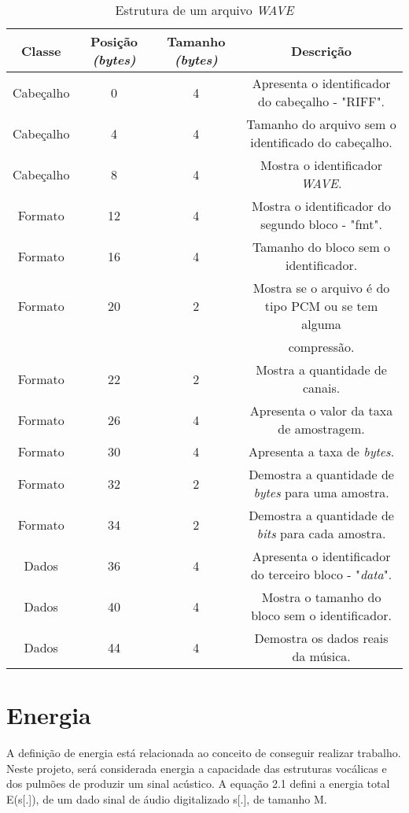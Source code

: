 \documentclass[a4paper,12pt,twoside,openright]{report}
\begin{document}
\vspace*{+10pt}

\begin{table}[h] 

	\caption{Estrutura de um arquivo \textit{WAVE}}
	\begin{tabular}{c|c|c|c}
		\textbf{Classe} & \textbf{Posi\c{c}\~{a}o \textit{(bytes)}} & \textbf{Tamanho \textit{(bytes)}} & \textbf{Descri\c{c}\~{a}o}\\
		\hline
		Cabe\c{c}alho & 0 & 4 & Apresenta o identificador do cabe\c{c}alho - "RIFF".\\
		Cabe\c{c}alho & 4 & 4 & Tamanho do arquivo sem o identificado do cabe\c{c}alho.\\
		Cabe\c{c}alho & 8 & 4 & Mostra o identificador \textit{WAVE}.\\
		\hline
		Formato & 12 & 4 & Mostra o identificador do segundo bloco - "fmt".\\
		Formato & 16 & 4 & Tamanho do bloco sem o identificador.\\
		Formato & 20 & 2 & Mostra se o arquivo \'{e} do tipo PCM ou se tem alguma \\ & & & compress\~{a}o.\\
		Formato & 22 & 2 & Mostra a quantidade de canais.\\
		Formato & 26 & 4 & Apresenta o valor da taxa de amostragem.\\
		Formato & 30 & 4 & Apresenta a taxa de \textit{bytes}.\\
		Formato & 32 & 2 & Demostra a quantidade de \textit{bytes} para uma amostra.\\
		Formato & 34 & 2 & Demostra a quantidade de \textit{bits} para cada amostra.\\
		\hline
		Dados & 36 & 4 & Apresenta o identificador do terceiro bloco - "\textit{data}".\\
		Dados & 40 & 4 & Mostra o tamanho do bloco sem o identificador.\\
		Dados & 44 & 4 & Demostra os dados reais da m\'{u}sica.
		
	\end{tabular}
\end{table}     



\section{Energia}
\label{energia}
\par A defini{\c c}\~{a}o de energia est\'{a} relacionada ao conceito de conseguir realizar trabalho. Neste projeto, ser\'{a} considerada energia a capacidade das estruturas voc\'{a}licas e dos pulm\~{o}es de produzir um sinal ac\'{u}stico. A equa{\c c}\~{a}o 2.1 defini a energia total E(s[.]), de um dado sinal de \'{a}udio digitalizado s[.], de tamanho M.
\end{document}
